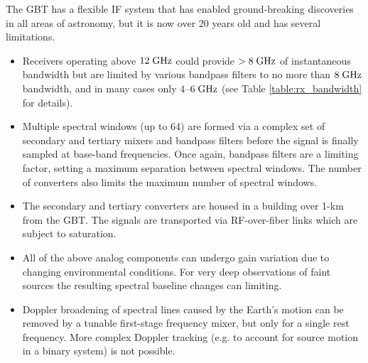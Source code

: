 \documentclass[10pt]{myNSF}
\begin{document}

The GBT has a flexible IF system that has enabled ground-breaking
discoveries in all areas of astronomy, but it is now over 20 years old
and has several limitations.
\begin{itemize}
  \item{Receivers operating above $12\; \textrm{GHz}$ could provide $>8\;
    \textrm{GHz}$ of instantaneous bandwidth but are limited by various
    bandpass filters to no more than $8\; \textrm{GHz}$ bandwidth, and in many
    cases only $4$--$6\; \textrm{GHz}$ (see Table \ref{table:rx_bandwidth} for
    details).}
  \item{Multiple spectral windows (up to 64) are formed via a complex
    set of secondary and tertiary mixers and bandpass filters before
    the signal is finally sampled at base-band frequencies.  Once
    again, bandpass filters are a limiting factor, setting a maximum
    separation between spectral windows.  The number of converters
    also limits the maximum number of spectral windows.}
  \item{The secondary and tertiary converters are housed in a building
    over 1-km from the GBT.  The signals are transported via
    RF-over-fiber links which are subject to saturation.}
  \item{All of the above analog components can undergo gain variation
    due to changing environmental conditions.  For very deep
    observations of faint sources the resulting spectral baseline
    changes can limiting.}
  \item{Doppler broadening of spectral lines caused by the Earth's
    motion can be removed by a tunable first-stage frequency mixer,
    but only for a single rest frequency.  More complex Doppler
    tracking (e.g. to account for source motion in a binary system) is
    not possible.}
\end{itemize}
\end{document}
